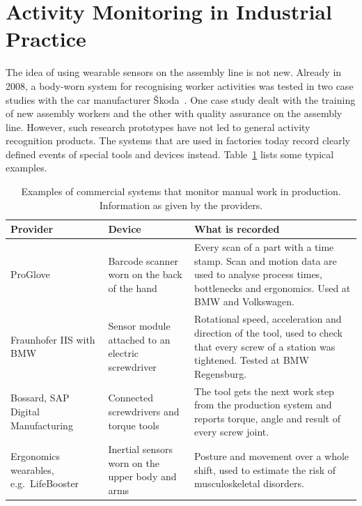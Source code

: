 \section{Activity Monitoring in Industrial Practice}
\label{sec:sota-industry}

The idea of using wearable sensors on the assembly line is not new. Already in
2008, a body-worn system for recognising worker activities was tested in two
case studies with the car manufacturer \v{S}koda~\cite{stiefmeier2008wearable}.
One case study dealt with the
training of new assembly workers and the other with quality assurance on the
assembly line. However,
such research prototypes have not led to general activity recognition products.
The systems that are used in factories today record clearly defined events of
special tools and devices instead. Table~\ref{tab:sota-industry} lists some
typical examples.

\begin{table}[!ht]
\centering
\small
\renewcommand{\arraystretch}{1.25}
\begin{tabularx}{\textwidth}{|>{\raggedright\arraybackslash}p{2.9cm}|>{\raggedright\arraybackslash}p{3.4cm}|>{\raggedright\arraybackslash}X|}
\hline
\textbf{Provider} & \textbf{Device} & \textbf{What is recorded} \\
\hline
ProGlove~\cite{proglove2026automotive, proglove2023bmw}
  & Barcode scanner worn on the back of the hand
  & Every scan of a part with a time stamp. Scan and motion data are used to
    analyse process times, bottlenecks and ergonomics. Used at BMW and
    Volkswagen. \\
\hline
Fraunhofer IIS with BMW~\cite{fraunhofer2017tool}
  & Sensor module attached to an electric screwdriver
  & Rotational speed, acceleration and direction of the tool, used to check
    that every screw of a station was tightened. Tested at BMW Regensburg. \\
\hline
Bossard, SAP Digital Manufacturing~\cite{bossard2026smarttool,
  sap2026intelligenttools}
  & Connected screwdrivers and torque tools
  & The tool gets the next work step from the production system and reports
    torque, angle and result of every screw joint. \\
\hline
Ergonomics wearables, e.g.\ LifeBooster~\cite{nsc2025lifebooster}
  & Inertial sensors worn on the upper body and arms
  & Posture and movement over a whole shift, used to estimate the risk of
    musculoskeletal disorders. \\
\hline
\end{tabularx}
\caption[Commercial systems that monitor manual work in production]{Examples
of commercial systems that monitor manual work in production. Information as
given by the providers.}
\label{tab:sota-industry}
\end{table}

